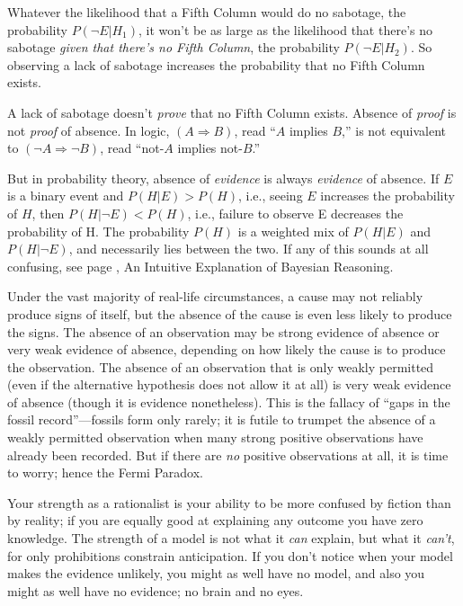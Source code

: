 {
 Whatever the likelihood that a Fifth Column would do no sabotage,
the probability $P(\lnot E|H_{1})$, it
won't be as large as the likelihood that
there's no sabotage \textit{given that
there's no Fifth Column}, the probability
$P(\lnot E|H_{2})$. So observing a lack of
sabotage increases the probability that no Fifth Column exists.}

{
 A lack of sabotage doesn't \textit{prove} that no
Fifth Column exists. Absence of \textit{proof} is not \textit{proof} of
absence. In logic, $(A \Rightarrow B)$, read ``$A$
implies $B$,'' is not equivalent to $(\lnot A
\Rightarrow  \lnot B)$, read ``not-$A$ implies
not-$B$.''}

{
 But in probability theory, absence of \textit{evidence} is always
\textit{evidence} of absence. If $E$ is a binary event and
$P(H|E) > P(H)$, i.e., seeing $E$ increases the
probability of $H$, then $P(H|\lnot E) < P(H)$,
i.e., failure to observe E decreases the probability of H. The
probability $P(H)$ is a weighted mix of $P(H|E)$ and
$P(H|\lnot E)$, and necessarily lies between the two. If
any of this sounds at all confusing, see page \pageref{intuitive_bayesian}, An Intuitive Explanation of
Bayesian Reasoning.}

{
 Under the vast majority of real-life circumstances, a cause may
not reliably produce signs of itself, but the absence of the cause is
even less likely to produce the signs. The absence of an observation
may be strong evidence of absence or very weak evidence of absence,
depending on how likely the cause is to produce the observation. The
absence of an observation that is only weakly permitted (even if the
alternative hypothesis does not allow it at all) is very weak evidence
of absence (though it is evidence nonetheless). This is the fallacy of
``gaps in the fossil
record''---fossils form only rarely; it is futile to
trumpet the absence of a weakly permitted observation when many strong
positive observations have already been recorded. But if there are
\textit{no} positive observations at all, it is time to worry; hence
the Fermi Paradox.}

{
 Your strength as a rationalist is your ability to be more confused
by fiction than by reality; if you are equally good at explaining any
outcome you have zero knowledge. The strength of a model is not what it
\textit{can} explain, but what it \textit{can't}, for
only prohibitions constrain anticipation. If you don't
notice when your model makes the evidence unlikely, you might as well
have no model, and also you might as well have no evidence; no brain
and no eyes.}

